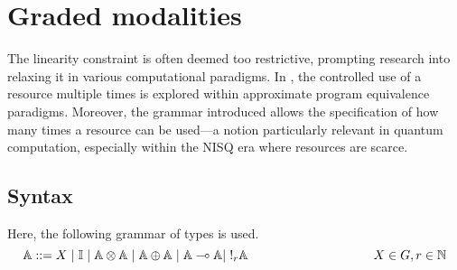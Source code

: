 \chapter{Graded modalities} \label{chap:graded}


The linearity
constraint is often deemed too restrictive, prompting research into relaxing it in various computational paradigms. In \cite{dahlqvist2023complete}, the controlled use of a resource multiple times is explored within approximate program equivalence paradigms. Moreover, the grammar introduced allows the specification of how many times a resource can be used—a notion particularly relevant in quantum computation, especially within the NISQ era where resources are scarce.


\section{Syntax}

Here, the following grammar of types is used.
\begin{equation*} \label{eq:grammar_graded}
  \centering
   \mathbb{A} ::= X  \hspace{3 pt} \vert \hspace{3 pt} \mathbb{I}  \hspace{3 pt}  \vert \hspace{3 pt} \mathbb{A}  \otimes  \mathbb{A} \hspace{3 pt} \vert \hspace{3 pt} \mathbb{A} \oplus \mathbb{A} \hspace{3 pt}  \vert \hspace{3 pt}   \mathbb{A} \multimap  \mathbb{A} \vert \hspace{3 pt} !_{r} \mathbb{A} \hspace{100pt} {X \in G,r \in \mathbb{N}} 
  \end{equation*}


